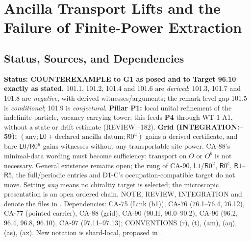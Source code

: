 \section{Ancilla Transport Lifts and the Failure of Finite-Power Extraction}\label{sec:ancilla-transport-lifts}

\subsection{Status, Sources, and Dependencies}

\textbf{Status: COUNTEREXAMPLE to G1 as posed and to Target 96.10 exactly as stated.}
101.1, 101.2, 101.4 and 101.6 are \emph{derived}; 101.3, 101.7 and 101.8 are \emph{negative},
with derived witnesses/arguments; the remark-level gap 101.5 is \emph{conditional}; 101.9 is \emph{conjectural}.
\textbf{Pillar P1:} local unital refinement of the indefinite-particle, vacancy-carrying tower;
this feeds \textbf{P4} through WT-1 A1, without a state or drift estimate (REVIEW:--182).
\textbf{Grid (INTEGRATION:--59):} \((\mathrm{any};\mathsf L0+\text{declared ancilla datum};\mathsf R0^u)\)
gains a derived certificate, and bare \(\mathsf L0/\mathsf R0^u\) gains witnesses without any transportable site power.
CA-88's minimal-data wording must become sufficiency: transport on \(O\) or \(O^b\) is not necessary.
General existence remains open; the rung of CA-90, \(\mathsf L1/\mathsf R0^u\), \(\mathsf R0^c\), \(\mathsf R1\)--\(\mathsf R5\),
the full/periodic entries and D1-C's occupation-compatible target do not move.
Setting \emph{any} means no chirality target is selected; the microscopic presentation is an open ordered chain.
NOTE, REVIEW, INTEGRATION and  denote the files in
.
Dependencies: CA-75 (Link (b1)), CA-76 (76.1--76.4, 76.12), CA-77 (pointed carrier), CA-88 (grid),
CA-90 (90.H, 90.0--90.2), CA-96 (96.2, 96.4, 96.8, 96.10), CA-97 (97.11--97.13);
CONVENTIONS (r), (t), (am), (aq), (as), (ax). New notation is shard-local, proposed in .


